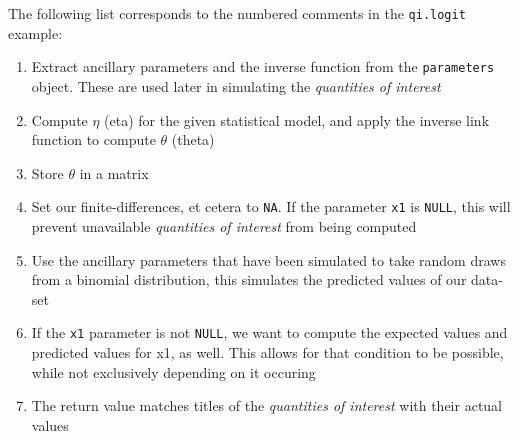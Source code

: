 \documentclass[11pt]{article}
\begin{document}
The following list corresponds to the numbered comments in the {\tt qi.logit} example:

\begin{enumerate}
	\item{Extract ancillary parameters and the inverse function from the {\tt parameters} object.  These are used later in simulating the \emph{quantities of interest}}
	\item{Compute $\eta$ (eta) for the given statistical model, and apply the inverse link function to compute $\theta$ (theta)}
	\item{Store $\theta$ in a matrix}
	\item{Set our finite-differences, et cetera to {\tt NA}.  If the parameter {\tt x1} is {\tt NULL}, this will prevent unavailable \emph{quantities of interest} from being computed}
	\item{Use the ancillary parameters that have been simulated to take random draws from a binomial distribution, this simulates the predicted values of our data-set}
	\item{If the {\tt x1} parameter is not {\tt NULL}, we want to compute the expected values and predicted values for x1, as well.  This allows for that condition to be possible, while not exclusively depending on it occuring}
	\item{The return value matches titles of the \emph{quantities of interest} with their actual values}
\end{enumerate}
\end{document}
